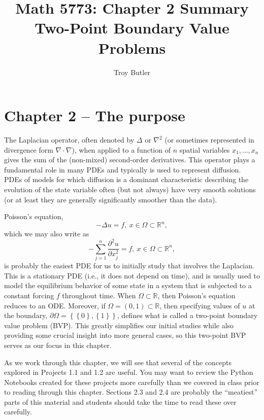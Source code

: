 \documentclass{amsart}
\theoremstyle{plain}
\theoremstyle{definition}
\theoremstyle{remark}
\theoremstyle{definition}
\numberwithin{equation}{section}
\numberwithin{equation}{section}
\newcommand{\set}[1]{\left\{#1\right\}}
\begin{document}
\title{Math 5773: Chapter 2 Summary\\ Two-Point Boundary Value Problems}
\author{Troy Butler}

\maketitle


\setcounter{section}{2}
\section*{Chapter 2 -- The purpose}

The Laplacian operator, often denoted by $\Delta$ or $\nabla^2$ (or sometimes represented in divergence form $\nabla\cdot\nabla$), when applied to a function of $n$ spatial variables $x_1, \ldots, x_n$ gives the sum of the (non-mixed) second-order derivatives.
This operator plays a fundamental role in many PDEs and typically is used to represent diffusion.
PDEs of models for which diffusion is a dominant characteristic describing the evolution of the state variable often (but not always) have very smooth solutions (or at least they are generally significantly  smoother than the data). 

Poisson's equation,
\[
	-\Delta u = f, \ x\in\Omega\subset\mathbb{R}^n,
\]
which we may also write as
\[
	-\sum_{j=1}^n \frac{\partial^2 u}{\partial x_j^2} = f, \ x\in\Omega\subset\mathbb{R}^n,
\]
is probably the easiest PDE for us to initially study that involves the Laplacian. 
This is a stationary PDE (i.e., it does not depend on time), and is usually used to model the equilibrium behavior of some state in a system that is subjected to a constant forcing $f$ throughout time. 
When $\Omega\subset\mathbb{R}$, then Poisson's equation reduces to an ODE.
Moreover, if $\Omega = (0,1)\subset\mathbb{R}$, then specifying values of $u$ at the boundary, $\partial\Omega = \set{\set{0}, \set{1}}$, defines what is called a two-point boundary value problem (BVP). 
This greatly simplifies our initial studies while also providing some crucial insight into more general cases, so this two-point BVP serves as our focus in this chapter.

As we work through this chapter, we will see that several of the concepts explored in Projects 1.1 and 1.2 are useful. 
You may want to review the Python Notebooks created for these projects more carefully than we covered in class prior to reading through this chapter. 
Sections 2.3 and 2.4 are probably the ``meatiest'' parts of this material and students should take the time to read these over carefully. 
\end{document}

